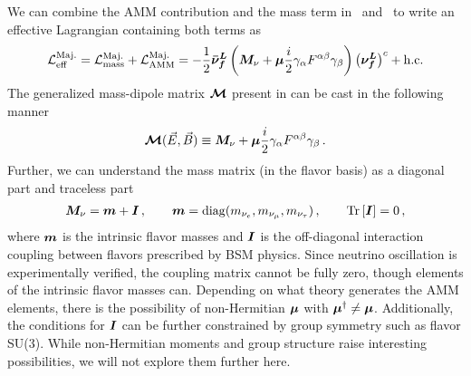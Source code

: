 We can combine the AMM contribution and the mass term in~ and~ to write an effective Lagrangian containing both terms as
\begin{align}
	\label{massmom:1}
    \mathcal{L}_{\rm eff}^{\rm Maj.}=\mathcal{L}_{\rm mass}^{\rm Maj.} + \mathcal{L}_{\rm AMM}^{\rm Maj.}=-\frac{1}{2}\boldsymbol{\bar{\nu}_{f}^{L}}\left(\boldsymbol{M}_{\nu}+\boldsymbol{\mu}\frac{i}{2}\gamma_{\alpha}F^{\alpha\beta}\gamma_{\beta}\right)\left(\boldsymbol{\nu_{f}^{L}}\right)^{c}+\mathrm{h.c.}
\end{align}
The generalized mass-dipole matrix $\boldsymbol{\mathcal M}$ present in  can be cast in the following manner
\begin{align}
	\label{massmom:2}
    {\boldsymbol{\mathcal{M}}}(\vec{E},\vec{B})\equiv\boldsymbol{M}_{\nu}+\boldsymbol{\mu}\frac{i}{2}\gamma_{\alpha}F^{\alpha\beta}\gamma_{\beta}\,.
\end{align}
Further, we can understand the mass matrix (in the flavor basis) as a diagonal part and traceless part
\begin{align}
	\label{massmom:3}
    \boldsymbol{M}_{\nu}=\boldsymbol{m}+\boldsymbol{I}\,,\qquad
    \boldsymbol{m}=\mathrm{diag}(m_{\nu_{e}},m_{\nu_{\mu}},m_{\nu_{\tau}})\,,\qquad
    \mathrm{Tr}\left[\boldsymbol{I}\right] = 0 \,,
\end{align}
where $\boldsymbol{m}$ is the intrinsic flavor masses and $\boldsymbol{I}$ is the off-diagonal interaction coupling between flavors prescribed by BSM physics. Since neutrino oscillation is experimentally verified, the coupling matrix cannot be fully zero, though elements of the intrinsic flavor masses can. Depending on what theory generates the AMM elements, there is the possibility of non-Hermitian $\boldsymbol{\mu}$ with $\boldsymbol{\mu}^{\dagger}\neq\boldsymbol{\mu}$. Additionally, the conditions for $\boldsymbol{I}$ can be further constrained by group symmetry such as flavor SU(3). While non-Hermitian moments and group structure raise interesting possibilities, we will not explore them further here. 

